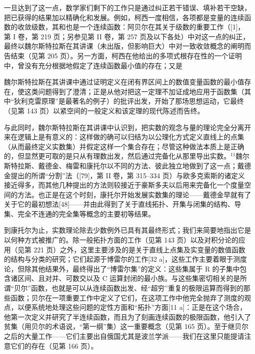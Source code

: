 一旦达到了这一点，数学家们剩下的工作只是通过纠正若干错误、填补若干空缺，把已获得的结果加以精确化和发展。例如，柯西一度相信，各项都是变量的连续函数的收敛级数，其和也是一个连续函数：阿贝尔在其关于级数的重要工作（{[}1{]}，第 I 卷，第 219 页；另参见第 II 卷，第 257 页及以下各处）中对这一点的纠正，最终以魏尔斯特拉斯在其讲课（未出版，但影响巨大）中对一致收敛概念的阐明而告结束（见第 205 页）。另一方面，柯西在他给出的多项式根存在性的一个证明中，曾没有充分根据地假定了连续函数最小值的存在；又是

魏尔斯特拉斯在其讲课中通过证明定义在闭有界区间上的数值变量函数的最小值存在，使这类问题得到了澄清；正是从他对把这一定理不加证成地应用于函数集（其中“狄利克雷原理”是最著名的例子）的批评出发，开始了那场思想运动，它最终（见第 143 页）以紧空间的一般定义和该定理的现代陈述而告终。

与此同时，魏尔斯特拉斯在其讲课中认识到，把实数的观念与量的理论完全分离开来在逻辑上是有意义的：这样做的确可以归结为以公理化方式定义直线上的点集（从而最终定义实数集）并假定这样一个集合存在；尽管这种做法本质上是正确的，但显然更可取的是只从有理数出发，然后通过完备化从那里导出实数。\(^{11}\)魏尔斯特拉斯、戴德金、梅雷和康托尔以不同的方法、彼此独立地做到了这一点；戴德金提出的所谓“分割”法（{[}79{]}，第 II 卷，第 315–334 页）与欧多克索斯的诸定义接近得多，而其他几种提出的方法则较接近于豪斯多夫以后用来完备化一个度量空间的方法。也正是在这个时刻，康托尔开始发展实数集的理论——戴德金早就有了关于它的最初想法{[}48{]}——并由此得到了关于直线拓扑、开集与闭集的结构、导集、完全不连通的完全集等概念的主要初等结果。

到康托尔为止，实数理论除去少数例外已具有其最终形式；我们来简要地指出它是以何种方式被推广的。除一般拓扑方面的工作（见第 143 页）以及对积分论的应用（见第 221 页）之外，这里主要涉及的是关于直线上点集及实变量的数值函数的结构与分类的研究；它们起源于博雷尔的工作{[}32 a{]}，这些工作主要着眼于测度论，但除其他结果外，最终得出了“博雷尔集”的定义：这些集属于 R 的子集中包含诸区间、且对并、可数交以及 C 运算封闭的最小族。与这些集密切相关的是所谓“贝尔”函数，也就是可以从连续函数出发、经“超穷”重复的极限运算而得到的那些函数；贝尔在一项重要工作中定义了它们，在这项工作中他完全抛弃了测度的观点，以便系统地处理这些问题的定性方面和“拓扑”方面{[}11 a{]}：正是在这个场合，他第一次定义并研究了半连续函数，而且为了刻画连续函数的极限函数，他引入了贫集（用贝尔的术语说，“第一纲”集）这一重要概念（见第 165 页）。至于继贝尔之后的大量工作——它们主要出自俄国尤其是波兰学派——我们在这里只能提请注意它们的存在（见第 166 页）。

